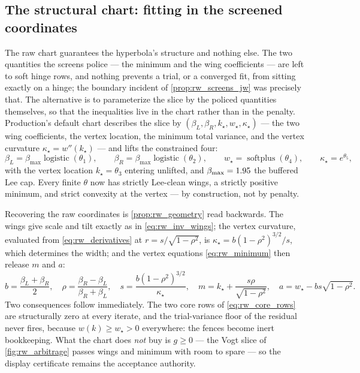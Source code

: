 \documentclass[11pt]{article}
\newcommand{\wmin}{w_\star}
\newcommand{\kmin}{k_\star}
\newcommand{\betL}{\beta_L}
\newcommand{\betR}{\beta_R}
\begin{document}
\subsection{The structural chart: fitting in the screened coordinates}
\label{sec:rw_structural}

The raw chart guarantees the hyperbola's structure and nothing else.  The two
quantities the screens police --- the minimum and the wing coefficients ---
are left to soft hinge rows, and nothing prevents a trial, or a converged
fit, from sitting exactly on a hinge; the boundary incident of
\cref{prop:rw_screens_jw} was precisely that.  The alternative is to
parameterize the slice by the policed quantities themselves, so that the
inequalities live in the chart rather than in the penalty.  Production's
default chart describes the slice by
$(\betL,\betR,\kmin,\wmin,\kappa_\star)$ --- the two wing coefficients, the
vertex location, the minimum total variance, and the vertex curvature
$\kappa_\star=w''(\kmin)$ --- and lifts the constrained four:
\begin{equation}
\betL=\beta_{\max}\operatorname{logistic}(\theta_1),\qquad
\betR=\beta_{\max}\operatorname{logistic}(\theta_2),\qquad
\wmin=\operatorname{softplus}(\theta_4),\qquad
\kappa_\star=e^{\theta_5},
\label{eq:rw_structural_lift}
\end{equation}
with the vertex location $\kmin=\theta_3$ entering unlifted, and
$\beta_{\max}=1.95$ the buffered Lee cap.  Every finite $\theta$
now has strictly Lee-clean wings, a strictly positive minimum, and strict
convexity at the vertex --- by construction, not by penalty.

Recovering the raw coordinates is \cref{prop:rw_geometry} read backwards.
The wings give scale and tilt exactly as in \eqref{eq:rw_inv_wings}; the
vertex curvature, evaluated from \eqref{eq:rw_derivatives} at
$r=s/\sqrt{1-\rho^2}$, is $\kappa_\star=b(1-\rho^2)^{3/2}/s$, which
determines the width; and the vertex equations \eqref{eq:rw_minimum} then
release $m$ and $a$:
\begin{equation}
b=\frac{\betL+\betR}{2},\quad
\rho=\frac{\betR-\betL}{\betR+\betL},\quad
s=\frac{b(1-\rho^2)^{3/2}}{\kappa_\star},\quad
m=\kmin+\frac{s\rho}{\sqrt{1-\rho^2}},\quad
a=\wmin-bs\sqrt{1-\rho^2}.
\label{eq:rw_structural_inverse}
\end{equation}
Two consequences follow immediately.  The two core rows of
\eqref{eq:rw_core_rows} are structurally zero at every iterate, and the
trial-variance floor of the residual never fires, because
$w(k)\ge\wmin>0$ everywhere: the fences become inert bookkeeping.  What the
chart does \emph{not} buy is $g\ge0$ --- the Vogt slice of
\cref{fig:rw_arbitrage} passes wings and minimum with room to spare --- so
the display certificate remains the acceptance authority.
\end{document}
